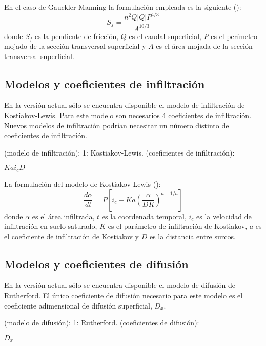 \documentclass[a4paper,12pt]{report}
\begin{document}
En el caso de Gauckler-Manning la formulación empleada es la siguiente (\cite{JaviSurcos1}):
\begin{equation}
S_f=\frac{n^2 Q|Q|P^{4/3}}{A^{10/3}}
\end{equation}
\noindent donde $S_f$ es la pendiente de fricción, $Q$ es el caudal superficial, $P$ es el perímetro mojado de la 
sección transversal superficial y $A$ es el área mojada de la sección transversal superficial. 

\subsection{Modelos y coeficientes de infiltración}
En la versión actual sólo se encuentra disponible el modelo de infiltración de Kostiakov-Lewis. Para este modelo son necesarios 4 coeficientes de infiltración. Nuevos modelos de infiltración podrían necesitar un número distinto de coeficientes de infiltración.
\begin{verbatimtab}[4]
(modelo de infiltración): 
		1: Kostiakov-Lewis.
(coeficientes de infiltración):
\end{verbatimtab}
\vspace{-0.5cm}
\hspace{1.8cm}$K$\hspace{0.9cm}$a$\hspace{0.9cm}$i_c$\hspace{0.9cm}$D$

La formulación del modelo de Kostiakov-Lewis (\cite{JaviSurcos1}):
\begin{equation}
\frac{d\alpha}{dt}=P\left[ i_c + Ka \left( \frac{\alpha}{DK} \right)^{a-1/a} \right]
\end{equation}
\noindent donde $\alpha$ es el área infiltrada, $t$ es la coordenada temporal, $i_c$ es la velocidad de infiltración en suelo saturado, $K$ es el parámetro de infiltración de Kostiakov, $a$ es el coeficiente de infiltración de Kostiakov y $D$ es la distancia entre surcos.

\subsection{Modelos y coeficientes de difusión}
En la versión actual sólo se encuentra disponible el modelo de difusión de Rutherford. El único coeficiente de difusión necesario para este modelo
es el coeficiente adimensional de difusión superficial, $D_x$.
\begin{verbatimtab}[4]
(modelo de difusión): 
		1: Rutherford.
(coeficientes de difusión):
\end{verbatimtab}
\vspace{-0.5cm}
\hspace{1.8cm}$D_x$ 
\end{document}
